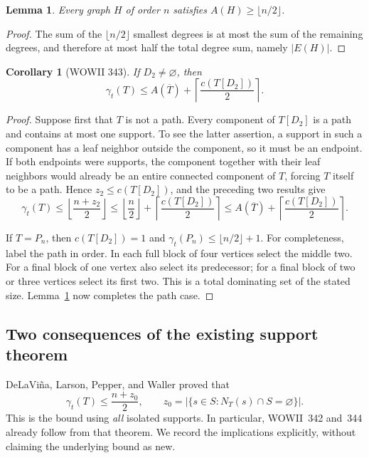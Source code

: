 \documentclass[11pt,a4paper]{article}
\newtheorem{lemma}[theorem]{Lemma}
\newtheorem{corollary}[theorem]{Corollary}
\theoremstyle{remark}
\begin{document}
\begin{lemma}\label{newtree:annihilation-half}
Every graph $H$ of order $n$ satisfies $A(H)\geq\lfloor n/2\rfloor$.
\end{lemma}
\begin{proof}
The sum of the $\lfloor n/2\rfloor$ smallest degrees is at most the sum
of the remaining degrees, and therefore at most half the total degree
sum, namely $|E(H)|$.
\end{proof}

\begin{corollary}[WOWII 343]\label{newtree:343}
If $D_2\ne\varnothing$, then
\[
 \gamma_t(T)\leq A(\overline T)
                  +\left\lceil\frac{c(T[D_2])}{2}\right\rceil.
\]
\end{corollary}
\begin{proof}
Suppose first that $T$ is not a path.  Every component of $T[D_2]$ is a
path and contains at most one support.  To see the latter assertion, a
support in such a component has a leaf neighbor outside the component,
so it must be an endpoint.  If both endpoints were supports, the
component together with their leaf neighbors would already be an entire
connected component of $T$, forcing $T$ itself to be a path.  Hence
$z_2\leq c(T[D_2])$, and the preceding two results give
\[
 \gamma_t(T)
 \leq\left\lfloor\frac{n+z_2}{2}\right\rfloor
 \leq\left\lfloor\frac n2\right\rfloor
       +\left\lceil\frac{c(T[D_2])}{2}\right\rceil
 \leq A(\overline T)+\left\lceil\frac{c(T[D_2])}{2}\right\rceil.
\]

If $T=P_n$, then $c(T[D_2])=1$ and
$\gamma_t(P_n)\leq\lfloor n/2\rfloor+1$.  For completeness, label the
path in order.  In each full block of four vertices select the middle
two.  For a final block of one vertex also select its predecessor; for a
final block of two or three vertices select its first two.  This is a
total dominating set of the stated size.  Lemma~\ref{newtree:annihilation-half}
now completes the path case.
\end{proof}

\subsection{Two consequences of the existing support theorem}

DeLaVi\~na, Larson, Pepper, and Waller proved
\cite[Theorem~4]{DLPW10} that
\begin{equation}\label{newtree:prior-support}
 \gamma_t(T)\leq\frac{n+z_0}{2},
 \qquad
 z_0=|\{s\in S:N_T(s)\cap S=\varnothing\}|.
\end{equation}
This is the bound using \emph{all} isolated supports.  In particular,
WOWII~342 and~344 already follow from that theorem.  We record the
implications explicitly, without claiming the underlying bound as new.
\end{document}
